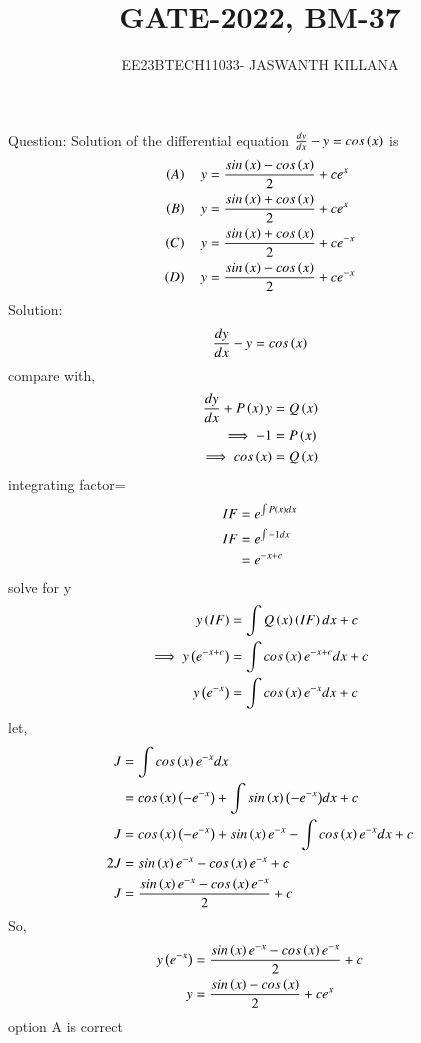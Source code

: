 \documentclass[journal,12pt,twocolumn]{IEEEtran}
\theoremstyle{remark}
\begin{document}

\vspace{3cm}

\title{GATE-2022, BM-37}
\author{EE23BTECH11033- JASWANTH KILLANA}
\maketitle
\newpage
\bigskip

\renewcommand{\thefigure}{\theenumi}
\renewcommand{\thetable}{\theenumi}
Question: Solution of the differential equation $\frac{dy}{dx}-y=cos\left(x\right)$ is
\begin{align}
\left(A\right)\quad y&=\frac{sin\left(x\right)-cos\left(x\right)}{2}+ce^x\\
\left(B\right)\quad y&=\frac{sin\left(x\right)+cos\left(x\right)}{2}+ce^x\\
\left(C\right)\quad y&=\frac{sin\left(x\right)+cos\left(x\right)}{2}+ce^{-x}\\
\left(D\right)\quad y&=\frac{sin\left(x\right)-cos\left(x\right)}{2}+ce^{-x}
\end{align}
Solution: \begin{align}\frac{dy}{dx}-y=cos\left(x\right)
\end{align}
compare with,
\begin{align}
\frac{dy}{dx}+P\left(x\right)y&=Q\left(x\right)\\
\implies -1&=P\left(x\right)\\
\implies cos\left(x\right)&=Q\left(x\right)
\end{align}
integrating factor=
\begin{align}
IF&=e^{\int P\left(x\right)dx}\\
IF&=e^{\int -1dx}\\
&=e^{-x+c}
\end{align}
solve for y
\begin{align}
y\left(IF\right)&=\int {Q\ensuremath{\left(x\right)}\ensuremath{\left(IF\right)}dx}+c\\
\implies y\left(e^{-x+c}\right)&=\int {cos\ensuremath{\left(x\right)}e^{-x+c}dx}+c\\
y\left(e^{-x}\right)&=\int {cos\ensuremath{\left(x\right)}e^{-x}dx}+c
\end{align}
let,
\begin{align}
J&=\int {cos\ensuremath{\left(x\right)}e^{-x}dx}\\
&=cos\left(x\right)\left(-e^{-x}\right)+\int {sin\ensuremath{\left(x\right)}\ensuremath{\left(-e^{-x}\right)}}dx+c\\
J&=cos\left(x\right)\left(-e^{-x}\right)+sin\left(x\right) e^{-x}-\int{cos\ensuremath{\left(x\right)}e^{-x}dx}+c\\
 2J&=sin\left(x\right) e^{-x}-cos\left(x\right)e^{-x}+c\\
 J&=\frac{sin\left(x\right) e^{-x}-cos\left(x\right)e^{-x}}{2}+c
\end{align}
So,
\begin{align}
y\left(e^{-x}\right)&=\frac{sin\left(x\right) e^{-x}-cos\left(x\right)e^{-x}}{2}+c\\
y&=\frac{sin\left(x\right)-cos\left(x\right)}{2}+ce^{x}
\end{align}
option A is correct
\end{document}

